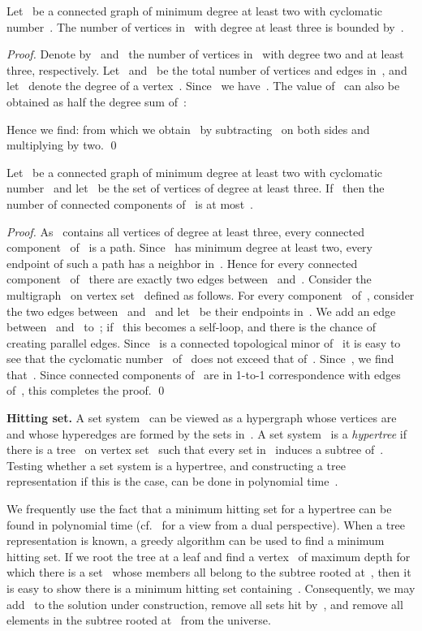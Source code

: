 \let\accentvec\vec  \documentclass{llncs}
\let\SSign\S
\renewcommand{\S}{\ensuremath{\mathcal{S}}\xspace}
\begin{document}
\begin{proposition} \label{proposition:degtwo}
Let~ be a connected graph of minimum degree at least two with cyclomatic number~. The number of vertices in~ with degree at least three is bounded by~.
\end{proposition}
\begin{proof}
Denote by~ and~ the number of vertices in~ with degree two and at least three, respectively. Let~ and~ be the total number of vertices and edges in~, and let~ denote the degree of a vertex~. Since~ we have~. The value of~ can also be obtained as half the degree sum of~:

Hence we find:
 from which we obtain~ by subtracting~ on both sides and multiplying by two.
\qed
\end{proof}

\begin{proposition} \label{proposition:numcomponents}
Let~ be a connected graph of minimum degree at least two with cyclomatic number~ and let~ be the set of vertices of degree at least three. If~ then the number of connected components of~ is at most~.
\end{proposition}
\begin{proof}
As~ contains all vertices of degree at least three, every connected component~ of~ is a path. Since~ has minimum degree at least two, every endpoint of such a path has a neighbor in~. Hence for every connected component~ of~ there are exactly two edges between~ and~. Consider the multigraph~ on vertex set~ defined as follows. For every component~ of~, consider the two edges between~ and~  and let~ be their endpoints in~. We add an edge between~ and~ to~; if~ this becomes a self-loop, and there is the chance of creating parallel edges. Since~ is a connected topological minor of~ it is easy to see that the cyclomatic number~ of~ does not exceed that of~. Since~, we find that~. Since connected components of~ are in 1-to-1 correspondence with edges of~, this completes the proof.
\qed
\end{proof}

\textbf{Hitting set.} A set system~ can be viewed as a hypergraph whose vertices are~ and whose hyperedges are formed by the sets in~. A set system~ is a \emph{hypertree} if there is a tree~ on vertex set~ such that every set in~ induces a subtree of~. Testing whether a set system is a hypertree, and constructing a tree representation if this is the case, can be done in polynomial time~\cite{Trick87}. 

We frequently use the fact that a minimum hitting set for a hypertree can be found in polynomial time (cf.~\cite[\SSign 2]{GuoN06} for a view from a dual perspective). When a tree representation is known, a greedy algorithm can be used to find a minimum hitting set. If we root the tree at a leaf and find a vertex~ of maximum depth for which there is a set~ whose members all belong to the subtree rooted at~, then it is easy to show there is a minimum hitting set containing~. Consequently, we may add~ to the solution under construction, remove all sets hit by~, and remove all elements in the subtree rooted at~ from the universe.
\end{document}
